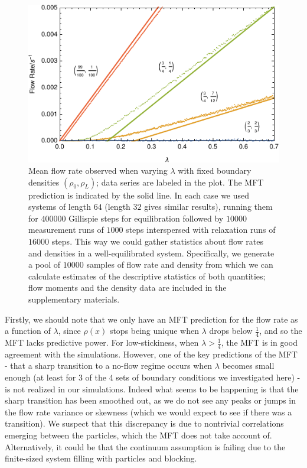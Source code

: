 \documentclass[
reprint,
 amsmath,amssymb,
 aps,
 prl,
]{revtex4-1}
\begin{document}
\begin{figure}[h!]
\vspace{1em}
\caption{\label{fig:lambdaScans} Mean flow rate observed when varying $\lambda$ with fixed boundary densities $(\rho_0, \rho_L)$; data series are labeled in the plot.
The MFT prediction is indicated by the solid line.
In each case we used systems of length $64$ (length $32$ gives similar results),
running them for $400000$ Gillispie steps for equilibration followed by $10000$ measurement runs of $1000$ steps interspersed with relaxation runs of $16000$
steps. This way we could gather statistics about flow rates and densities in a well-equilibrated system. Specifically, we generate a pool of $10000$ samples of flow rate and density
from which we can calculate estimates of the descriptive statistics of both quantities; flow moments and the density data are included in the supplementary materials.
\vspace{1em}}
\includegraphics[width=0.98\linewidth]{newFlowMean}
    \vspace{-1em}
\end{figure}

Firstly, we should note that we only have an MFT prediction for the flow rate as a function of $\lambda$, since $\rho(x)$ stops being unique when $\lambda$ drops below $\frac{1}{4}$,
and so the MFT lacks predictive power. For low-stickiness, when $\lambda>\frac{1}{4}$, the MFT is in good agreement with the simulations.
However, one of the key predictions of the MFT - that a sharp transition to a no-flow regime occurs when $\lambda$ becomes small enough (at least for 3 of the 4 sets of
boundary conditions we investigated here) - is not realized in our simulations. Indeed what seems to be happening is that the sharp transition has been smoothed out, as we
do not see any peaks or jumps in the flow rate variance or skewness (which we would expect to see if there was a transition). We suspect that this discrepancy is due to nontrivial correlations emerging between the particles, which the MFT
does not take account of. Alternatively, it could be that the continuum assumption is failing due to the finite-sized system filling with particles and blocking.
\end{document}
